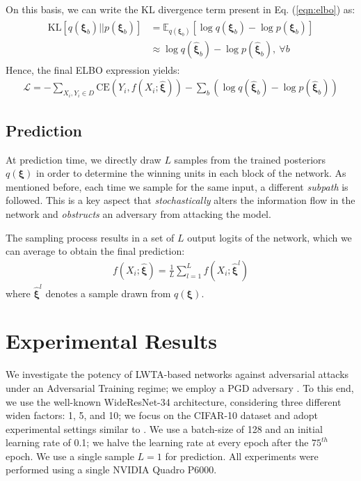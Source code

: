 \documentclass{article}
\begin{document}
	On this basis, we can write the KL divergence term present in Eq. (\ref{eqn:elbo}) as:
\begin{align}
		\begin{split}
		\mathrm{KL}[q(\boldsymbol\xi_{b})||p(\boldsymbol\xi_{b})] &= \mathbb{E}_{q(\boldsymbol\xi_b)}[\log q(\boldsymbol\xi_b) - \log p(\boldsymbol\xi_b)]\\
		&\approx \log q(\hat{\boldsymbol\xi}_b) - \log p(\hat{\boldsymbol\xi}_b), \ \forall b
		\end{split}
	\end{align}
	Hence, the final ELBO expression yields:
	\begin{align}
		\mathcal{L} = -\sum_{X_i, Y_i \in D} \mathrm{CE}(Y_i, f(X_i;\hat{\boldsymbol\xi})) - \sum_b \left( \log q(\hat{\boldsymbol\xi}_b) - \log p(\hat{\boldsymbol\xi}_b) \right)
	\end{align}
	
	\subsection{Prediction}
	
	At prediction time, we directly draw $L$ samples from the trained posteriors $q(\boldsymbol\xi)$ in order to determine the winning units in each block of the network. As mentioned before, each time we sample for the same input, a different \textit{subpath} is followed.  This is a key aspect that \textit{stochastically} alters the information flow in the network and \textit{obstructs} an adversary from attacking the model. 
	
	The sampling process results in a set of $L$ output logits of the network, which we can average to obtain the final prediction:
\begin{align}
	    f(X_i; \hat{\boldsymbol\xi}) = \frac{1}{L}\sum_{l=1}^L f(X_i; \hat{\boldsymbol\xi}^l)
	\end{align}
    where $\hat{\boldsymbol\xi}^l$ denotes a sample drawn from  $q(\boldsymbol\xi)$. 
\section{Experimental Results}
	
	We investigate the potency of LWTA-based networks against adversarial attacks under an Adversarial Training regime; we employ a PGD adversary \citep{madry2017towards}. To this end, we use the well-known WideResNet-34 \citep{wideresnet} architecture, considering three different widen factors: 1, 5, and 10; we focus on the CIFAR-10 dataset and adopt experimental settings similar to \cite{wu2021wider}. We use a batch-size of 128 and an initial learning rate of 0.1; we halve the learning rate at every epoch after the $75^{th}$ epoch. We use a single sample $L=1$ for prediction. All experiments were performed using a single NVIDIA Quadro P6000.
	
\end{document}
